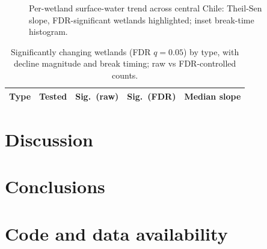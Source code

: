 \documentclass[review]{elsarticle}
\begin{document}
\begin{figure}[t]\centering
\caption{Per-wetland surface-water trend across central Chile: Theil-Sen slope,
FDR-significant wetlands highlighted; inset break-time histogram.}
\label{fig:trendmap}
\end{figure}

\begin{table}[t]\centering
\caption{Significantly changing wetlands (FDR $q=0.05$) by type, with decline
magnitude and break timing; raw vs FDR-controlled counts.}
\label{tab:results}
\begin{tabular}{lrrrr}
\toprule
Type & Tested & Sig.\ (raw) & Sig.\ (FDR) & Median slope \\
\midrule
\bottomrule
\end{tabular}
\end{table}

\section{Discussion}\label{sec:discussion}

\section{Conclusions}\label{sec:conclusions}

\section*{Code and data availability}
\end{document}
